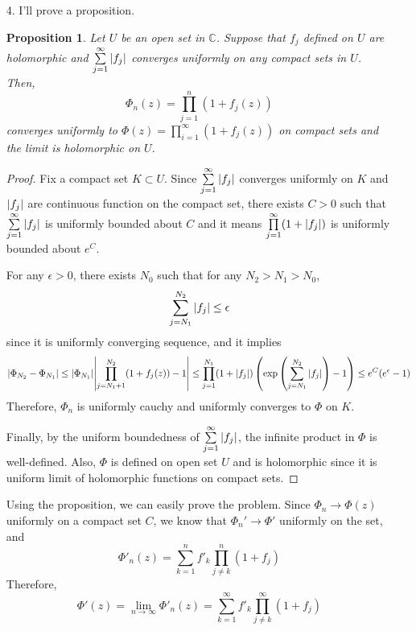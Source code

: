 \documentclass{article}
\newtheorem{proposition}{Proposition}
\begin{document}
\begin{enumerate}
\item[4.] I'll prove a proposition.
\begin{proposition}
Let $U$ be an open set in $\mathbb{C}$. Suppose that $f_j$ defined on $U$ are holomorphic and $\sum\limits_{j=1}^\infty \abs{f_j}$ converges uniformly on any compact sets in $U$. Then,
\begin{equation*}
\Phi_n(z)=\prod_{j=1}^n (1+f_j(z))
\end{equation*}
converges uniformly to $\Phi(z)=\prod_{i=1}^\infty (1+f_j(z))$ on compact sets and the limit is holomorphic on $U$.
\end{proposition}
\begin{proof}
Fix a compact set $K\subset U$. Since $\sum\limits_{j=1}^\infty \abs{f_j}$ converges uniformly on $K$ and $\abs{f_j}$ are continuous function on the compact set, there exists $C>0$ such that $\sum\limits_{j=1}^\infty \abs{f_j}$ is uniformly bounded about $C$ and it means $\prod\limits_{j=1}^\infty (1+\abs{f_j})$ is uniformly bounded about $e^C$.

For any $\epsilon>0$, there exists $N_0$ such that for any $N_2>N_1>N_0$, 
\begin{equation*}
\sum\limits_{j=N_1}^{N_2} \abs{f_j}\leq \epsilon
\end{equation*}
since it is uniformly converging sequence, and it implies
\begin{equation*}
\abs{\Phi_{N_2}-\Phi_{N_1}}\leq \abs{\Phi_{N_1}}\abs{\prod_{j=N_1+1}^{N_2}(1+f_j(z))-1}\leq \prod_{j=1}^{N_1} (1+\abs{f_j})\left(\exp\left(\sum\limits_{j=N_1}^{N_2} \abs{f_j}\right)-1\right)\leq e^C(e^\epsilon-1)
\end{equation*}
Therefore, $\Phi_n$ is uniformly cauchy and uniformly converges to $\Phi$ on $K$.

Finally, by the uniform boundedness of $\sum\limits_{j=1}^\infty \abs{f_j}$, the infinite product in $\Phi$ is well-defined. Also, $\Phi$ is defined on open set $U$ and is holomorphic since it is uniform limit of holomorphic functions on compact sets.
\end{proof}

Using the proposition, we can easily prove the problem. Since $\Phi_n\rightarrow \Phi(z)$ uniformly on a compact set $C$, we know that $\Phi_n'\rightarrow \Phi'$ uniformly on the set, and 
\begin{equation*}
\Phi'_n(z)=\sum\limits_{k=1}^n f'_k\prod\limits_{j\neq k}^n (1+f_j)
\end{equation*}
Therefore,
\begin{equation*}
\Phi'(z)=\lim\limits_{n\rightarrow \infty}\Phi'_n(z)=\sum\limits_{k=1}^\infty f'_k\prod\limits_{j\neq k}^\infty (1+f_j)
\end{equation*}
\end{enumerate}
\end{document}

